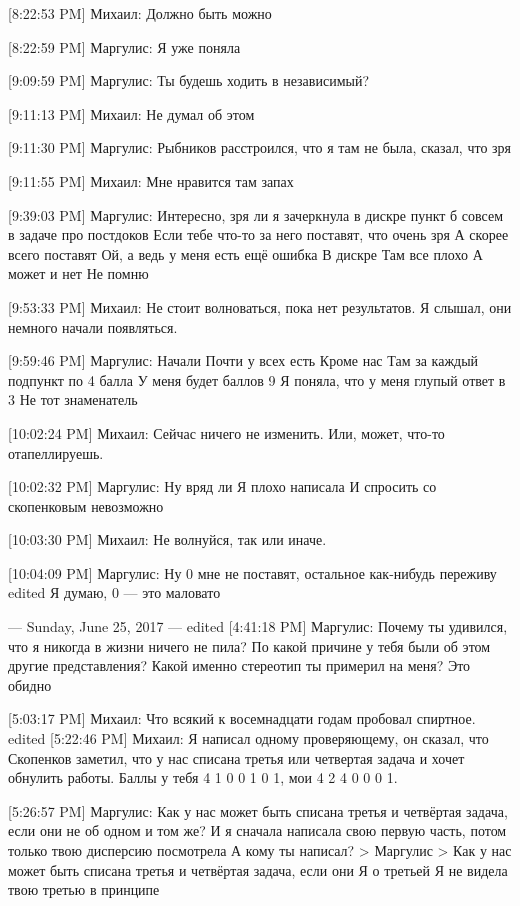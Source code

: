 \documentclass{article}
\begin{document}
[8:22:53 PM] Михаил:
Должно быть можно

[8:22:59 PM] Маргулис:
Я уже поняла

[9:09:59 PM] Маргулис:
Ты будешь ходить в независимый?

[9:11:13 PM] Михаил:
Не думал об этом

[9:11:30 PM] Маргулис:
Рыбников расстроился, что я там не была, сказал, что зря

[9:11:55 PM] Михаил:
Мне нравится там запах

[9:39:03 PM] Маргулис:
Интересно, зря ли я зачеркнула в дискре пункт б совсем в задаче про постдоков
 Если тебе что-то за него поставят, что очень зря
 А скорее всего поставят
 Ой, а ведь у меня есть ещё ошибка
 В дискре
 Там все плохо
 А может и нет
 Не помню

[9:53:33 PM] Михаил:
Не стоит волноваться, пока нет результатов. Я слышал, они немного начали появляться.

[9:59:46 PM] Маргулис:
Начали
 Почти у всех есть
 Кроме нас
 Там за каждый подпункт по 4 балла
 У меня будет баллов 9
 Я поняла, что у меня глупый ответ в 3
 Не тот знаменатель

[10:02:24 PM] Михаил:
Сейчас ничего не изменить. Или, может, что-то отапеллируешь.

[10:02:32 PM] Маргулис:
Ну вряд ли
 Я плохо написала
 И спросить со скопенковым невозможно

[10:03:30 PM] Михаил:
Не волнуйся, так или иначе.

[10:04:09 PM] Маргулис:
Ну 0 мне не поставят, остальное как-нибудь переживу
edited 
Я думаю, 0 — это маловато

--- Sunday, June 25, 2017 ---
edited 
[4:41:18 PM] Маргулис:
Почему ты удивился, что я никогда в жизни ничего не пила?
 По какой причине у тебя были об этом другие представления?
 Какой именно стереотип ты примерил на меня?
 Это обидно

[5:03:17 PM] Михаил:
Что всякий к восемнадцати годам пробовал спиртное.
edited 
[5:22:46 PM] Михаил:
Я написал одному проверяющему, он сказал, что Скопенков заметил, что у нас списана третья или четвертая задача и хочет обнулить работы. Баллы у тебя 4 1 0 0 1 0 1, мои 4 2 4 0 0 0 1.

[5:26:57 PM] Маргулис:
Как у нас может быть списана третья и четвёртая задача, если они не об одном и том же?
 И я сначала написала свою первую часть, потом только твою дисперсию посмотрела
 А кому ты написал?
> Маргулис
> Как у нас может быть списана третья и четвёртая задача, если они
Я о третьей
 Я не видела твою третью в принципе
\end{document}
